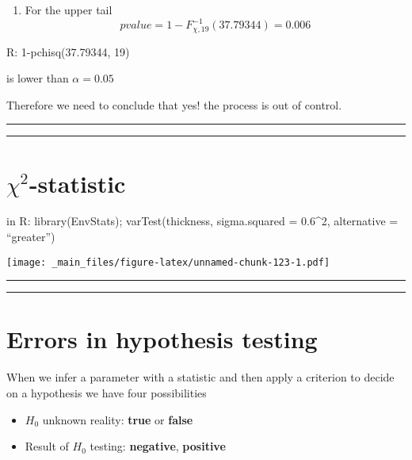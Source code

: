 \documentclass[
]{book}
\providecommand{\tightlist}{%
  \setlength{\itemsep}{0pt}\setlength{\parskip}{0pt}}
\begin{document}
\begin{enumerate}
\def\labelenumi{\arabic{enumi}.}
\setcounter{enumi}{1}
\tightlist
\item
  For the upper tail \[pvalue=1-F_{\chi,19}^{-1}(37.79344)= 0.006\]
\end{enumerate}

R: 1-pchisq(37.79344, 19)

is lower than \(\alpha=0.05\)

Therefore we need to conclude that yes! the process is out of control.

\begin{center}\rule{0.5\linewidth}{0.5pt}\end{center}

\begin{center}\rule{0.5\linewidth}{0.5pt}\end{center}

\hypertarget{chi2-statistic-3}{%
\section{\texorpdfstring{\(\chi^2\)-statistic}{\textbackslash chi\^{}2-statistic}}\label{chi2-statistic-3}}

in R: library(EnvStats);
varTest(thickness, sigma.squared = 0.6\^{}2, alternative = ``greater'')

\texttt{[image: \_main\_files/figure-latex/unnamed-chunk-123-1.pdf]}

\begin{center}\rule{0.5\linewidth}{0.5pt}\end{center}

\begin{center}\rule{0.5\linewidth}{0.5pt}\end{center}

\hypertarget{errors-in-hypothesis-testing}{%
\section{Errors in hypothesis testing}\label{errors-in-hypothesis-testing}}

When we infer a parameter with a statistic and then apply a criterion to decide on a hypothesis we have four possibilities

\begin{itemize}
\tightlist
\item
  \(H_0\) unknown reality: \textbf{true} or \textbf{false}
\item
  Result of \(H_0\) testing: \textbf{negative}, \textbf{positive}
\end{itemize}
\end{document}
